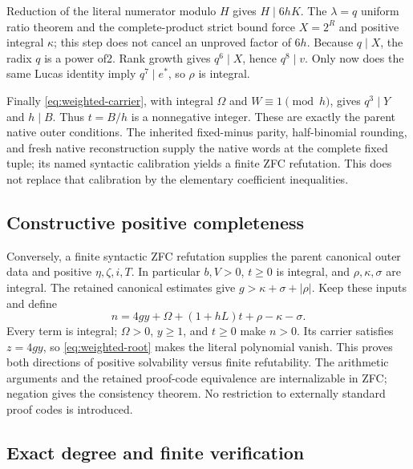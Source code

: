 Reduction of the literal numerator modulo $H$ gives $H\mid6hK$. The
$\lambda=q$ uniform ratio theorem and the complete-product strict bound force
$X=2^R$ and positive integral $\kappa$; this step does not cancel an
unproved factor of $6h$. Because $q\mid X$, the radix $q$ is a power of2.
Rank growth gives $q^6\mid X$, hence $q^8\mid v$. Only now does the same
Lucas identity imply $q^7\mid e^*$, so $\rho$ is integral.

Finally \eqref{eq:weighted-carrier}, with integral $\Omega$ and
$W\equiv1\pmod h$, gives $q^3\mid Y$ and $h\mid B$. Thus $t=B/h$ is a
nonnegative integer. These are exactly the parent native outer conditions.
The inherited fixed-minus parity, half-binomial rounding, and fresh native
reconstruction supply the native words at the complete fixed tuple; its
named syntactic calibration yields a finite ZFC refutation. This does not
replace that calibration by the elementary coefficient inequalities.

\subsection{Constructive positive completeness}

Conversely, a finite syntactic ZFC refutation supplies the parent canonical
outer data and positive $\eta,\zeta,i,T$. In particular $b,V>0$, $t\ge0$ is
integral, and $\rho,\kappa,\sigma$ are integral. The retained canonical
estimates give $g>\kappa+\sigma+|\rho|$. Keep these inputs and define
\[
 n=4gy+\Omega+(1+hL)t+\rho-\kappa-\sigma.
\]
Every term is integral; $\Omega>0$, $y\ge1$, and $t\ge0$ make $n>0$.
Its carrier satisfies $z=4gy$, so \eqref{eq:weighted-root} makes the literal
polynomial vanish. This proves both directions of positive solvability
versus finite refutability. The arithmetic arguments and the retained
proof-code equivalence are internalizable in ZFC; negation gives the
consistency theorem. No restriction to externally standard proof codes is
introduced.

\subsection{Exact degree and finite verification}

